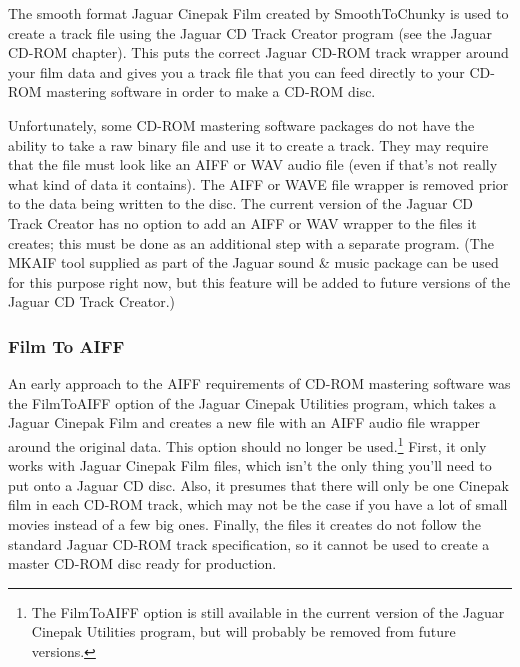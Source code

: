 \documentclass[12pt,letterpaper,twoside]{article}
\begin{document}
The smooth format Jaguar Cinepak Film created by SmoothToChunky is used to create a track file using the Jaguar CD Track Creator program (see the Jaguar CD-ROM chapter). This puts the correct Jaguar CD-ROM track wrapper around your film data and gives you a track file that you can feed directly to your CD-ROM mastering software in order to make a CD-ROM disc. 

Unfortunately, some CD-ROM mastering software packages do not have the ability to take a raw binary file and use it to create a track. They may require that the file must look like an AIFF or WAV audio file (even if that's not really what kind of data it contains). The AIFF or WAVE file wrapper is removed prior to the data being written to the disc. The current version of the Jaguar CD Track Creator has no option to add an AIFF or WAV wrapper to the files it creates; this must be done as an additional step with a separate program. (The MKAIF tool supplied as part of the Jaguar sound \& music package can be used for this purpose right now, but this feature will be added to future versions of the Jaguar CD Track Creator.)

\subsubsection{Film To AIFF}
An early approach to the AIFF requirements of CD-ROM mastering software was the FilmToAIFF option of the Jaguar Cinepak Utilities program, which takes a Jaguar Cinepak Film and creates a new file with an AIFF audio file wrapper around the original data. This option should no longer be used.\footnote{The FilmToAIFF option is still available in the current version of the Jaguar Cinepak Utilities program, but will probably be removed from future versions.} First, it only works with Jaguar Cinepak Film files, which isn't the only thing you'll need to put onto a Jaguar CD disc. Also, it presumes that there will only be one Cinepak film in each CD-ROM track, which may not be the case if you have a lot of small movies instead of a few big ones. Finally, the files it creates do not follow the standard Jaguar CD-ROM track specification, so it cannot be used to create a master CD-ROM disc ready for production. 
\end{document}
